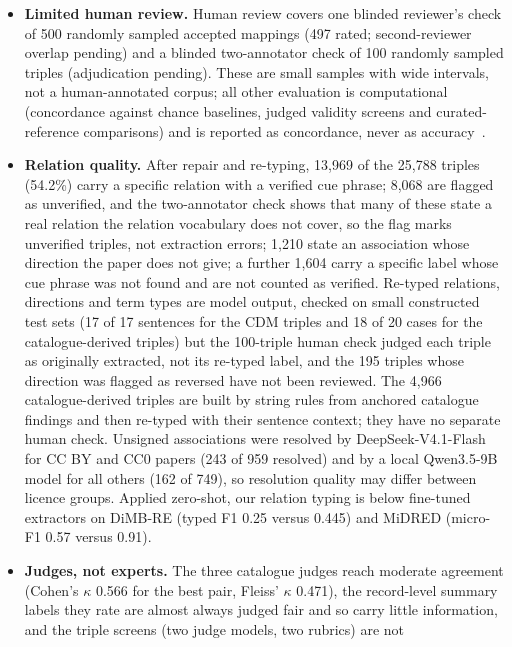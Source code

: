 \documentclass[referee,lineno,pdflatex,sn-vancouver-num]{sn-jnl}
\theoremstyle{thmstyleone}%
\theoremstyle{thmstyletwo}%
\theoremstyle{thmstylethree}%
\begin{document}
\begin{itemize}
\item \textbf{Limited human review.} Human review covers one blinded
reviewer's check of 500 randomly sampled accepted mappings (497 rated; second-reviewer
overlap pending) and a blinded two-annotator check of 100 randomly sampled
triples (adjudication pending). These are small samples with wide intervals,
not a human-annotated corpus; all other evaluation is computational (concordance
against chance baselines, judged validity screens and curated-reference
comparisons) and is reported as concordance, never as
accuracy~\cite{chen2025llmbench}.
\item \textbf{Relation quality.} After repair and re-typing,
13{,}969 of the 25{,}788 triples (54.2\%) carry a specific relation with
a verified cue phrase; 8{,}068 are flagged as unverified, and the
two-annotator check shows that many of these state a real relation the
relation vocabulary does not cover, so the flag marks unverified triples, not
extraction errors; 1{,}210
state an association whose direction the paper does not give; a further
1{,}604 carry a specific label whose cue phrase was not found and are not
counted as verified. Re-typed relations, directions and term types are model
output, checked on small constructed test sets (17 of 17 sentences for the
CDM triples and 18 of 20 cases for the catalogue-derived triples) but the 100-triple human check judged each triple as originally extracted,
not its re-typed label, and the 195 triples
whose direction was flagged as reversed have not been reviewed. The 4{,}966
catalogue-derived triples are built by string rules from anchored catalogue
findings and then re-typed with their sentence context; they have no
separate human check. Unsigned associations were resolved by
DeepSeek-V4.1-Flash for CC BY and CC0 papers (243 of 959 resolved) and by a
local Qwen3.5-9B model for all others (162 of 749), so resolution quality may differ between licence groups. Applied zero-shot,
our relation typing is below fine-tuned extractors on DiMB-RE (typed F1 0.25
versus 0.445) and MiDRED (micro-F1 0.57 versus 0.91).
\item \textbf{Judges, not experts.} The three catalogue judges reach
moderate agreement (Cohen's $\kappa$ 0.566 for the best pair, Fleiss'
$\kappa$ 0.471), the record-level summary labels they rate are almost
always judged fair and so carry little information, and the triple screens (two judge models, two rubrics) are not

\end{itemize}
\end{document}
